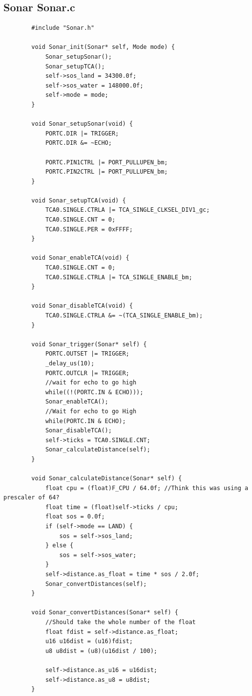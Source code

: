 \documentclass[11pt,a4paper,titlepage]{report}
\begin{document}
	\subsection{Sonar Sonar.c}\label{appendix:final_code_sonar_c}
	\begin{lstlisting}
		#include "Sonar.h"
		
		void Sonar_init(Sonar* self, Mode mode) {
			Sonar_setupSonar();
			Sonar_setupTCA();
			self->sos_land = 34300.0f;
			self->sos_water = 148000.0f;
			self->mode = mode;
		}
		
		void Sonar_setupSonar(void) {
			PORTC.DIR |= TRIGGER;
			PORTC.DIR &= ~ECHO;
			
			PORTC.PIN1CTRL |= PORT_PULLUPEN_bm;
			PORTC.PIN2CTRL |= PORT_PULLUPEN_bm;
		}
		
		void Sonar_setupTCA(void) {
			TCA0.SINGLE.CTRLA |= TCA_SINGLE_CLKSEL_DIV1_gc;
			TCA0.SINGLE.CNT = 0;
			TCA0.SINGLE.PER = 0xFFFF;
		}
		
		void Sonar_enableTCA(void) {
			TCA0.SINGLE.CNT = 0;
			TCA0.SINGLE.CTRLA |= TCA_SINGLE_ENABLE_bm;
		}
		
		void Sonar_disableTCA(void) {
			TCA0.SINGLE.CTRLA &= ~(TCA_SINGLE_ENABLE_bm);
		}
		
		void Sonar_trigger(Sonar* self) {
			PORTC.OUTSET |= TRIGGER;
			_delay_us(10);
			PORTC.OUTCLR |= TRIGGER;
			//wait for echo to go high
			while((!(PORTC.IN & ECHO)));
			Sonar_enableTCA();
			//Wait for echo to go High
			while(PORTC.IN & ECHO);
			Sonar_disableTCA();
			self->ticks = TCA0.SINGLE.CNT;
			Sonar_calculateDistance(self);
		}
		
		void Sonar_calculateDistance(Sonar* self) {
			float cpu = (float)F_CPU / 64.0f; //Think this was using a prescaler of 64?
			float time = (float)self->ticks / cpu;
			float sos = 0.0f;
			if (self->mode == LAND) {
				sos = self->sos_land;
			} else {
				sos = self->sos_water;
			}
			self->distance.as_float = time * sos / 2.0f;
			Sonar_convertDistances(self);
		}
		
		void Sonar_convertDistances(Sonar* self) {
			//Should take the whole number of the float
			float fdist = self->distance.as_float;
			u16 u16dist = (u16)fdist;
			u8 u8dist = (u8)(u16dist / 100);
			
			self->distance.as_u16 = u16dist;
			self->distance.as_u8 = u8dist;
		}
	\end{lstlisting}
	
\end{document}
